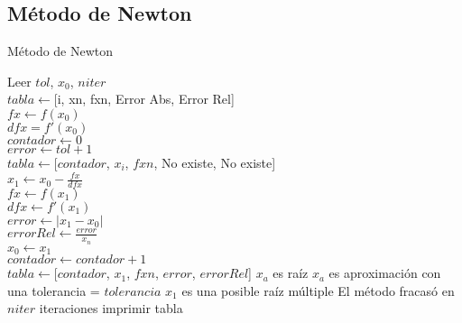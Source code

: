 \documentclass[12pt]{article}
\begin{document}
\subsection{Método de Newton}
\begin{algorithm}[H]
	\caption{Método de Newton}
	\SetAlgoLined
	Leer $tol$, $x_0$, $niter$\\
	$tabla \leftarrow $[i, xn, fxn, Error Abs, Error Rel] \\
	$fx \leftarrow f(x_0)$\\
	$dfx = f'(x_0)$\\
	$contador \leftarrow 0$ \\
	$error \leftarrow tol + 1$\\
	$tabla \leftarrow $[$contador$, $x_i$, $fxn$, No existe, No existe]\\
	{
		$x_1 \leftarrow x_0 - \frac{fx}{dfx}$ \\
		$fx \leftarrow f(x_1)$ \\
		$dfx \leftarrow f'(x_1)$ \\
		$error \leftarrow |x_1 - x_0|$ \\
		$error Rel \leftarrow \frac{error}{x_n}$ \\
		$x_0 \leftarrow x_1$\\
		$contador \leftarrow contador + 1$ \\
		$tabla \leftarrow $[$contador$, $x_{1}$, $fxn$, $error$, $error Rel$]
	}
	{$x_a$ es raíz}
	{$x_a$ es aproximación con una tolerancia = $tolerancia$}
	{$x_1$ es una posible raíz múltiple}
	\Else
	{El método fracasó en $niter$ iteraciones}	
	imprimir tabla
\end{algorithm}
\end{document}
